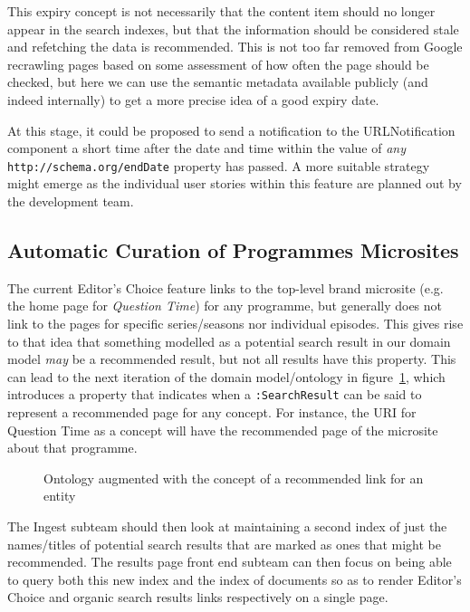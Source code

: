 This expiry concept is not necessarily that the content item
should no longer appear in the search indexes, but that the
information should be considered stale and refetching the data
is recommended. This is not too far removed from Google
recrawling pages based on some assessment of how often the page
should be checked, but here we can use the semantic metadata
available publicly (and indeed internally) to get a more
precise idea of a good expiry date.

At this stage, it could
be proposed to send a notification to the URLNotification
component a short time after the date and time within the
value of \emph{any}
\texttt{http://schema.org/endDate} property has passed. A more
suitable strategy might emerge as the individual user stories
within this feature are planned out by the development team.

\subsection{Automatic Curation of Programmes Microsites}

The current Editor's Choice feature links to the top-level
brand microsite (e.g. the home page for \emph{Question Time})
for any programme, but generally does not link to the pages
for specific series/seasons nor individual episodes. This gives
rise to that idea that something modelled as a potential
search result in our domain model \emph{may} be a recommended
result, but not all results have this property. This can
lead to the next iteration of the domain model/ontology in
figure~\ref{fig:recommended-ontology}, which introduces a
property that indicates when a \texttt{:SearchResult}
can be said to represent a recommended page for any concept.
For instance, the URI for Question Time as a concept
will have the recommended page of the microsite about that
programme.

\begin{figure}
  \begin{center}
    \begin{dot2tex}[dot,pgf,scale=0.41]
      
    \end{dot2tex}
  \end{center}
  \caption{Ontology augmented with the concept of a recommended link for an entity}
  \label{fig:recommended-ontology}
\end{figure}

The Ingest subteam should then look at maintaining a second
index of just the names/titles of potential search results
that are marked as ones that might be recommended. The
results page front end subteam can then focus on being
able to query both this new index and the index of documents
so as to render Editor's Choice and organic search results
links respectively on a single page.

